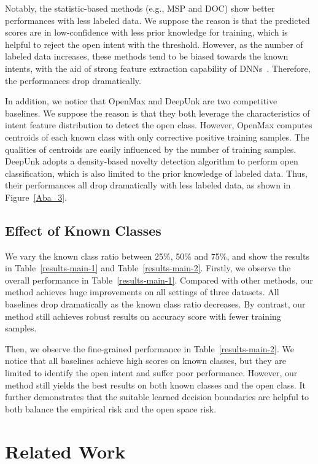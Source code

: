 \documentclass[letterpaper]{article} %
\begin{document}
	Notably, the statistic-based methods (e.g., MSP and DOC) show better performances with less labeled data. We suppose the reason is that the predicted scores are in low-confidence with less prior knowledge for training, which is helpful to reject the open intent with the threshold. However, as the number of labeled data increases, these methods tend to be biased towards the known intents, with the aid of strong feature extraction capability of DNNs~\cite{7298640}. Therefore, the performances drop dramatically.


	In addition, we notice that OpenMax and DeepUnk are two competitive baselines. We suppose the reason is that they both leverage the characteristics of intent feature distribution to detect the open class. However, OpenMax computes centroids of each known class with only corrective positive training samples. The qualities of centroids are easily influenced by the number of training samples. DeepUnk adopts a density-based novelty detection algorithm to perform open classification, which is also limited to the prior knowledge of labeled data. Thus, their performances all drop dramatically with less labeled data, as shown in Figure~\ref{Aba_3}.


	\subsection{Effect of Known Classes}
	We vary the known class ratio between 25\%, 50\% and 75\%, and show the results in Table~\ref{results-main-1} and Table~\ref{results-main-2}. Firstly, we observe the overall performance in Table~\ref{results-main-1}. Compared with other methods, our method achieves huge improvements on all settings of three datasets. All baselines drop dramatically as the known class ratio decreases. By contrast, our method still achieves robust results on accuracy score with fewer training samples.

	Then, we observe the fine-grained performance in Table~\ref{results-main-2}. We notice that all baselines achieve high scores on known classes, but they are limited to identify the open intent and suffer poor performance. However, our method still yields the best results on both known classes and the open class. It further demonstrates that the suitable learned decision boundaries are helpful to both balance the empirical risk and the open space risk.

	\section{Related Work}
\end{document}
